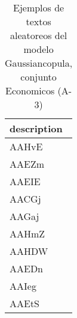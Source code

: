 \begin{table}[H]
\centering
\fontsize{8}{14}\selectfont
\caption{Ejemplos de textos aleatoreos del modelo Gaussiancopula, conjunto Economicos (A-3)}
\label{table-sample10-economicos-a-3-gaussiancopula-text}
\begin{tabular}{|m{50em}|}
\hline
\rowcolor[gray]{0.8}
description \\
\hline AAHvE \\
\hline AAEZm \\
\hline AAEIE \\
\hline AACGj \\
\hline AAGaj \\
\hline AAHmZ \\
\hline AAHDW \\
\hline AAEDn \\
\hline AAIeg \\
\hline AAEtS \\
\hline
\end{tabular}
\end{table}
